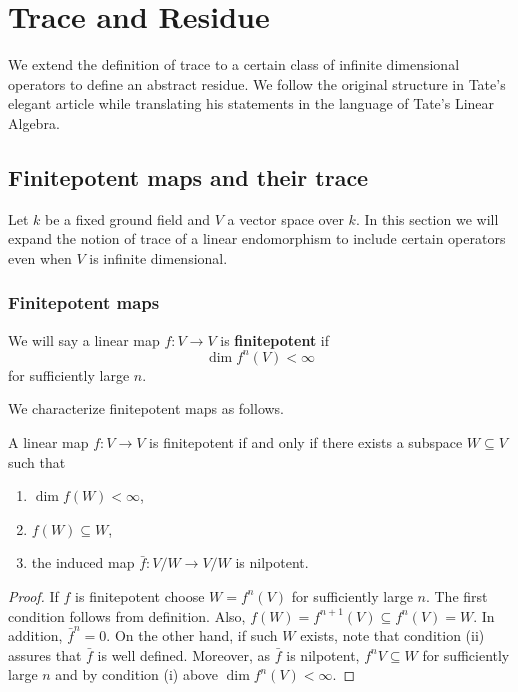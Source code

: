 \chapter{Trace and Residue}\label{ch:trace-and-residue}
We extend the definition of trace to a certain class of infinite dimensional operators to define an abstract residue. We follow the original structure in Tate's elegant article \cite{Tate} while translating his statements in the language of Tate's Linear Algebra.
\section{Finitepotent maps and their trace}
Let $k$ be a fixed ground field and $V$ a vector space over $k$. In this section we will expand the notion of trace of a linear endomorphism to include certain operators even when $V$ is infinite dimensional.
\subsection*{Finitepotent maps}
\begin{definition}\label{def:finitepotent}
	We will say a linear map $f\colon V \to V$ is \textbf{finitepotent} if
	\[
		\dim f^{n}(V) < \infty
	\]
	for sufficiently large $n$.
\end{definition}
We characterize finitepotent maps as follows.
\begin{lemma}\label{lemm:characterization-of-finitepotent-maps}
	A linear map $f\colon V \to V$ is finitepotent if and only if there exists a subspace $W \subseteq V$ such that
	\begin{enumerate}[label = (\roman*)]
		\item $\dim f(W) < \infty$,
		\item $f(W) \subseteq W$,
		\item the induced map $\bar{f}\colon V/W \to V/W$ is nilpotent.
	\end{enumerate}
\end{lemma}
\begin{proof}
	If $f$ is finitepotent choose $W = f^{n}(V)$ for sufficiently large $n$. The first condition follows from definition. Also, $f(W) = f^{n+1}(V) \subseteq f^{n}(V) = W$. In addition, $\bar{f}^{n} = 0$. On the other hand, if such $W$ exists, note that condition (ii) assures that $\bar{f}$ is well defined. Moreover, as $\bar{f}$ is nilpotent, $f^{n}V \subseteq W$ for sufficiently large $n$ and by condition (i) above $\dim f^{n}(V) < \infty$.
\end{proof}
